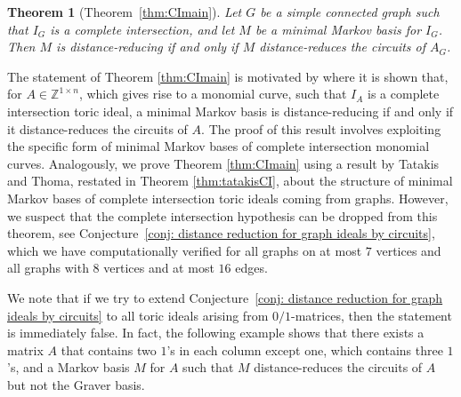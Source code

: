 \documentclass[a4paper, 12pt]{article}
\newcommand{\ZZ}{\mathbb Z}
\theoremstyle{plain}
\newtheorem*{theorem*}{Theorem}
\theoremstyle{definition}
\theoremstyle{remark}
\begin{document}
\begin{theorem*}[Theorem~\ref{thm:CImain}]
    Let $G$ be a simple connected graph such that $I_G$ is a complete intersection,
    and let $M$ be a minimal Markov basis for $I_G$. Then $M$ is distance-reducing if
    and only if $M$ distance-reduces the circuits of $A_G$.
\end{theorem*}

The statement of Theorem \ref{thm:CImain} is motivated by \cite[Corollary 5.2]{CK_2024} where it is shown that, for $A \in \ZZ^{1 \times n}$, which gives rise to a monomial curve, such that $I_A$ is a complete intersection toric ideal, a minimal Markov basis is distance-reducing if and only if it distance-reduces the circuits of $A$. The proof of this result involves exploiting the specific form of minimal Markov bases of complete intersection monomial curves. Analogously, we prove Theorem \ref{thm:CImain} using a result by Tatakis and Thoma, restated in Theorem \ref{thm:tatakisCI}, about the structure of minimal Markov bases of complete intersection toric ideals coming from graphs.
However, we suspect that the complete intersection hypothesis can be dropped from this theorem, see Conjecture~\ref{conj: distance reduction for graph ideals by circuits}, which we have computationally verified for all graphs on at most $7$ vertices and all graphs with $8$ vertices and at most $16$ edges.


We note that if we try to extend Conjecture~\ref{conj: distance reduction for graph ideals by circuits} to all toric ideals arising from $0/1$-matrices, then the statement is immediately false. In fact, the following example shows that there exists a matrix $A$ that contains two $1$'s in each column except one, which contains three $1$'s, and a Markov basis $M$ for $A$ such that $M$ distance-reduces the circuits of $A$ but not the Graver basis.
\end{document}
